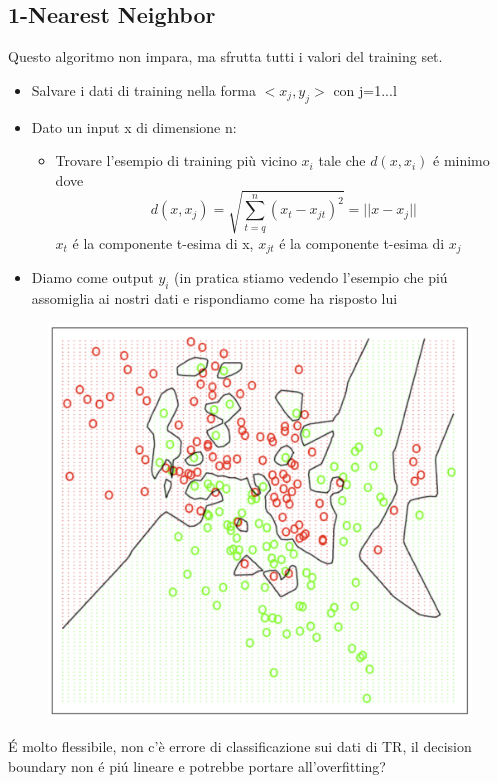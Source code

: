 \documentclass{article}
\begin{document}
\subsection{1-Nearest Neighbor}
Questo algoritmo non impara, ma sfrutta tutti i valori del training set.
\begin{itemize}
    \item Salvare i dati di training nella forma $<x_j,y_j>$ con j=1...l
    \item Dato un input x di dimensione n:
    \begin{itemize}
        \item Trovare l'esempio di training più vicino $x_i$ tale che $d(x,x_i)$ é minimo \newline
        dove \[d(x,x_j)=\sqrt{\sum_{t=q}^n(x_t-x_{jt})^2}=||x-x_j||\] $x_t$ é la componente t-esima di x, $x_{jt}$ é la componente t-esima di $x_j$
    \end{itemize}
    \item Diamo come output $y_i$ (in pratica stiamo vedendo l'esempio che piú assomiglia ai nostri dati e rispondiamo come ha risposto lui
\end{itemize}
\begin{figure}[H]
\centering
\includegraphics[scale=0.4]{Images/1-nn.png}
\end{figure}
É molto flessibile, non c'è errore di classificazione sui dati di TR, il decision boundary non é piú lineare e potrebbe portare all'overfitting?
\end{document}
